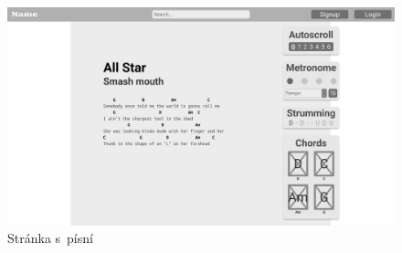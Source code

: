 \begin{figure}[h!]
    \centering
    \includegraphics[width=\textwidth]{assets/song_page.png}
    \caption{Stránka s~písní}
    \label{fig:song_page}
\end{figure}